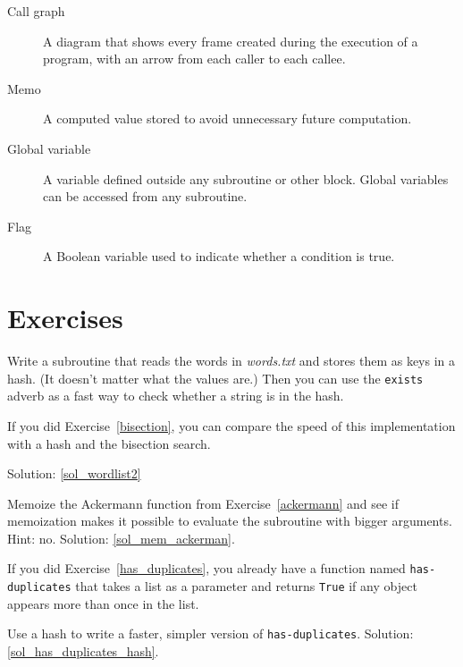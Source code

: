 \begin{description}
\item[Call graph] A diagram that shows every frame created during
the execution of a program, with an arrow from each caller to
each callee. 

\item[Memo] A computed value stored to avoid unnecessary future 
computation.

\item[Global variable]  A variable defined outside any 
subroutine or other block.  Global variables can be 
accessed from any subroutine.

\item[Flag] A Boolean variable used to indicate whether a condition
is true.

\end{description}


\section{Exercises}

\begin{exercise}
\label{wordlist2}

Write a subroutine that reads the words in \emph{words.txt} and
stores them as keys in a hash.  (It doesn't matter what the
values are.)  Then you can use the {\tt exists} adverb
as a fast way to check whether a string is in
the hash.

If you did Exercise~\ref{bisection}, you can compare the speed
of this implementation with a hash and the bisection search.

Solution: \ref{sol_wordlist2}

\end{exercise}


\begin{exercise}
\label{mem_ackerman}
Memoize the Ackermann function from Exercise~\ref{ackermann} 
and see if memoization makes it possible to evaluate the 
subroutine with bigger arguments.  Hint: no.
Solution: \ref{sol_mem_ackerman}.

\end{exercise}



\begin{exercise}
\label{has_duplicates_hash}

If you did Exercise~\ref{has_duplicates}, you already have
a function named \verb"has-duplicates" that takes a list
as a parameter and returns {\tt True} if any object
appears more than once in the list.

Use a hash to write a faster, simpler version of
\verb"has-duplicates". 
Solution: \ref{sol_has_duplicates_hash}.

\end{exercise}


